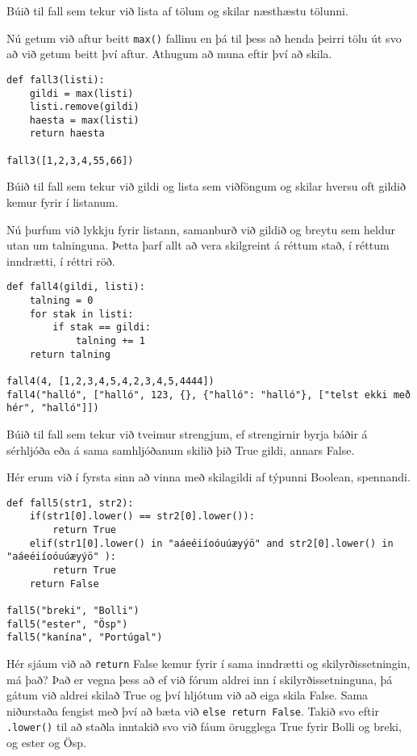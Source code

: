 \begin{exercise}\label{fun3}
Búið til fall sem tekur við lista af tölum og skilar næsthæstu tölunni.
\end{exercise}
\begin{Answer}[ref={fun3}]
Nú getum við aftur beitt \texttt{max()} fallinu en þá til þess að henda þeirri tölu út svo að við getum beitt því aftur.
Athugum að muna eftir því að skila.
	\begin{lstlisting}
def fall3(listi):
	gildi = max(listi)
	listi.remove(gildi)
	haesta = max(listi)
	return haesta

fall3([1,2,3,4,55,66])\end{lstlisting}
\end{Answer}

\begin{exercise}\label{fun4}
Búið til fall sem tekur við gildi og lista sem viðföngum og skilar hversu oft gildið kemur fyrir í listanum.
\end{exercise}
\begin{Answer}[ref={fun4}]
Nú þurfum við lykkju fyrir listann, samanburð við gildið og breytu sem heldur utan um talninguna.
Þetta þarf allt að vera skilgreint á réttum stað, í réttum inndrætti, í réttri röð.
\newpage
	\begin{lstlisting}
def fall4(gildi, listi):
	talning = 0
	for stak in listi:
		if stak == gildi:
			talning += 1
	return talning

fall4(4, [1,2,3,4,5,4,2,3,4,5,4444])
fall4("halló", ["halló", 123, {}, {"halló": "halló"}, ["telst ekki með hér", "halló"]])\end{lstlisting}
\end{Answer}

\begin{exercise}\label{fun5}
Búið til fall sem tekur við tveimur strengjum, ef strengirnir byrja báðir á sérhljóða eða á sama samhljóðanum skilið þið True gildi, annars False.
\end{exercise}
\begin{Answer}[ref={fun5}]
Hér erum við í fyrsta sinn að vinna með skilagildi af týpunni Boolean, spennandi.


	\begin{lstlisting}
def fall5(str1, str2):
	if(str1[0].lower() == str2[0].lower()):
		return True
	elif(str1[0].lower() in "aáeéiíoóuúæyýö" and str2[0].lower() in "aáeéiíoóuúæyýö" ):
		return True
	return False

fall5("breki", "Bolli")
fall5("ester", "Ösp")
fall5("kanína", "Portúgal")
\end{lstlisting}
Hér sjáum við að \texttt{return} False kemur fyrir í sama inndrætti og skilyrðissetningin, má það?
Það er vegna þess að ef við fórum aldrei inn í skilyrðissetninguna, þá gátum við aldrei skilað True og því hljótum við að eiga skila False.
Sama niðurstaða fengist með því að bæta við \texttt{else return False}.
Takið svo eftir \texttt{.lower()} til að staðla inntakið svo við fáum örugglega True fyrir Bolli og breki, og ester og Ösp.

\end{Answer}

